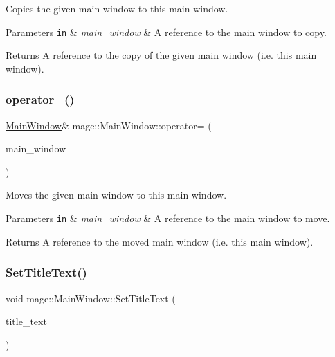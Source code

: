 Copies the given main window to this main window.


\begin{DoxyParams}[1]{Parameters}
\mbox{\tt in}  & {\em main\+\_\+window} & A reference to the main window to copy. \\
\hline
\end{DoxyParams}
\begin{DoxyReturn}{Returns}
A reference to the copy of the given main window (i.\+e. this main window). 
\end{DoxyReturn}
\hypertarget{classmage_1_1_main_window_a684d547966f69ef5df793b5ce516f76a}{}\label{classmage_1_1_main_window_a684d547966f69ef5df793b5ce516f76a} 
\subsubsection{\texorpdfstring{operator=()}{operator=()}\hspace{0.1cm}{\footnotesize\ttfamily [2/2]}}
{\footnotesize\ttfamily \hyperlink{classmage_1_1_main_window}{Main\+Window}\& mage\+::\+Main\+Window\+::operator= (\begin{DoxyParamCaption}\item[{\hyperlink{classmage_1_1_main_window}{Main\+Window} \&\&}]{main\+\_\+window }\end{DoxyParamCaption})\hspace{0.3cm}{\ttfamily [delete]}}

Moves the given main window to this main window.


\begin{DoxyParams}[1]{Parameters}
\mbox{\tt in}  & {\em main\+\_\+window} & A reference to the main window to move. \\
\hline
\end{DoxyParams}
\begin{DoxyReturn}{Returns}
A reference to the moved main window (i.\+e. this main window). 
\end{DoxyReturn}
\hypertarget{classmage_1_1_main_window_a58fe60e4f660c67b92c90d85e515645d}{}\label{classmage_1_1_main_window_a58fe60e4f660c67b92c90d85e515645d} 
\subsubsection{\texorpdfstring{Set\+Title\+Text()}{SetTitleText()}\hspace{0.1cm}{\footnotesize\ttfamily [1/2]}}
{\footnotesize\ttfamily void mage\+::\+Main\+Window\+::\+Set\+Title\+Text (\begin{DoxyParamCaption}\item[{const wstring \&}]{title\+\_\+text }\end{DoxyParamCaption})}

